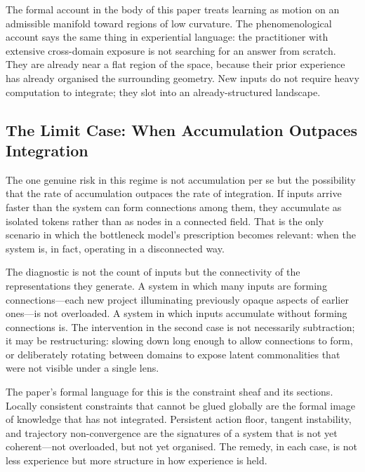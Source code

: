 \documentclass[12pt,oneside]{article}
\theoremstyle{plain}
\theoremstyle{definition}
\theoremstyle{remark}
\begin{document}
The formal account in the body of this paper treats learning as motion on an
admissible manifold toward regions of low curvature. The phenomenological
account says the same thing in experiential language: the practitioner with
extensive cross-domain exposure is not searching for an answer from scratch. They
are already near a flat region of the space, because their prior experience has
already organised the surrounding geometry. New inputs do not require heavy
computation to integrate; they slot into an already-structured landscape.

\subsection*{The Limit Case: When Accumulation Outpaces Integration}

The one genuine risk in this regime is not accumulation per se but the
possibility that the rate of accumulation outpaces the rate of integration. If
inputs arrive faster than the system can form connections among them, they
accumulate as isolated tokens rather than as nodes in a connected field. That is
the only scenario in which the bottleneck model's prescription becomes relevant:
when the system is, in fact, operating in a disconnected way.

The diagnostic is not the count of inputs but the connectivity of the
representations they generate. A system in which many inputs are forming
connections---each new project illuminating previously opaque aspects of earlier
ones---is not overloaded. A system in which inputs accumulate without forming
connections is. The intervention in the second case is not necessarily
subtraction; it may be restructuring: slowing down long enough to allow
connections to form, or deliberately rotating between domains to expose latent
commonalities that were not visible under a single lens.

The paper's formal language for this is the constraint sheaf and its sections.
Locally consistent constraints that cannot be glued globally are the formal image
of knowledge that has not integrated. Persistent action floor, tangent
instability, and trajectory non-convergence are the signatures of a system that
is not yet coherent---not overloaded, but not yet organised. The remedy, in each
case, is not less experience but more structure in how experience is held.
\end{document}
